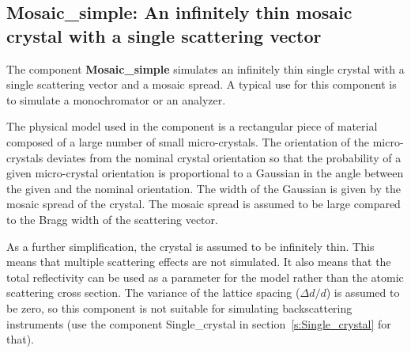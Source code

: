 
\subsection{Mosaic\_simple: An infinitely thin mosaic crystal with a single scattering
  vector}
\label{s:mosaic-simple}

The component {\bf Mosaic\_simple} simulates an infinitely thin single
crystal with a single scattering vector and a mosaic spread. A typical
use for this component is to simulate a monochromator or an analyzer.

The physical model used in the component is a rectangular piece of
material composed of a large number of small micro-crystals.
The orientation of the
micro-crystals deviates from the nominal crystal orientation so that the
probability of a given micro-crystal orientation is proportional to a
Gaussian in the angle between the given and the nominal orientation. The
width of the Gaussian is given by the mosaic spread of the crystal. The
mosaic spread is assumed to be large compared to the Bragg width of the
scattering vector.

As a further simplification, the crystal is assumed to be infinitely
thin. This means that multiple scattering effects are not simulated. It
also means that the total reflectivity can be used as a parameter for
the model rather than the atomic scattering cross section. The variance
of the lattice spacing ($\Delta d/d$) is assumed to be zero, so this
component is not suitable for simulating backscattering instruments (use
the component Single\_crystal in section~\ref{s:Single_crystal} for that).

